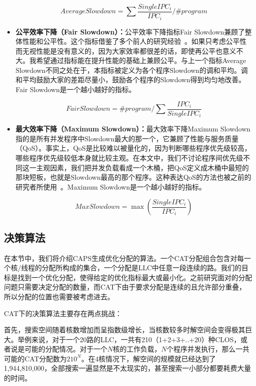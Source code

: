 \begin{itemize}
\begin{equation}
	AverageSlowdown = \sum\frac{SingleIPC_i}{IPC_i} / \#program
\end{equation}

\item \textbf{公平效率下降（Fair Slowdown）：}公平效率下降指标Fair Slowdown兼顾了整体性能和公平性。这个指标借鉴了多个前人的研究经验~\parencite{luo2001balancing, chang2014cooperative}。如果只考虑公平性而无视性能是没有意义的，因为大家效率都很差的话，即使再公平也意义不大。我希望通过指标能在提升性能的基础上兼顾公平。与上一个指标Average Slowdown不同之处在于，本指标被定义为各个程序Slowdown的调和平均。调和平均鼓励大家的差距尽量小，鼓励各个程序的Slowdown得到均匀地改善。Fair Slowdown是一个越小越好的指标。

\begin{equation}
	FairSlowdown = \#program / {\sum\frac{IPC_i}{SingleIPC_i}}
\end{equation}

\item \textbf{最大效率下降（Maximum Slowdown）：}最大效率下降Maximum Slowdown指的是所有并发程序中Slowdown最大的那一个，它兼顾了性能与服务质量（QoS）。事实上，QoS是比较难以被量化的，因为判断哪些程序优先级较高，哪些程序优先级较低本身就比较主观。在本文中，我们不讨论程序间优先级不同这一主观因素，我们把并发负载看成一个木桶，把QoS定义成木桶中最短的那块短板，也就是Slowdown最高的那个程序。这种表达QoS的方法也被之前的研究者所使用~\parencite{manikantan2012probabilistic}。Maximum Slowdown是一个越小越好的指标。

\begin{equation}
MaxSlowdown=\max(\frac{SingleIPC_i}{IPC_i})
\label{eq:qos}
\end{equation}

\end{itemize}

\subsection{决策算法}

在本节中，我们将介绍CAPS生成优化分配的算法。一个CAT分配组合包含对每一个核/线程的分配所构成的集合，一个分配是LLC中任意一段连续的路。我们的目标是找到一个优化分配，使得给定的优化指标最大或最小化。之前研究面对的分配问题只需要决定分配的数量，而CAT下由于要求分配是连续的且允许部分重叠，所以分配的位置也需要被考虑进去。

CAT下的决策算法主要存在两点挑战：

首先，搜索空间随着核数增加而呈指数级增长，当核数较多时解空间会变得极其巨大。举例来说，对于一个20路的LLC，一共有210（1+2+3+..+20）种CLOS，或者说是可能的分配情况。对于一个$N$核的工作负载，$N$个程序并发执行，那么一共可能的CAT分配数为$210^N$。在4核情况下，解空间的规模就已经达到了1,944,810,000，全部搜索一遍显然是不太现实的，甚至搜索一小部分都要耗费大量的时间。

